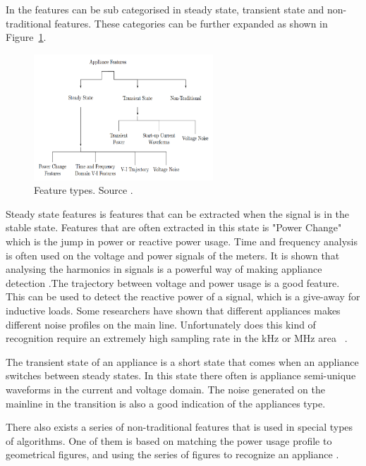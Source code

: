 In  the features can be sub categorised in steady state, transient state and non-traditional features.  These categories can be further expanded as shown in Figure~\ref{fig:FTR}. 

\begin{figure}[H]
\centering
\includegraphics[width=0.6\textwidth]{billeder/featureOverview.png}
\caption[Feature types.]{Feature types. Source \citep{RefWorks:17}.}
\label{fig:FTR}
\end{figure}

Steady state features is features that can be extracted when the signal is in the stable state. Features that are often extracted in this state is "Power Change" which is the jump in power or reactive power usage. Time and frequency analysis is often used on the voltage and power signals of the meters. It is shown that analysing the harmonics in signals is a powerful way of making appliance detection \citep{RefWorks:29}.The trajectory between voltage and power usage is a good feature. This can be used to detect the reactive power of a signal, which is a give-away for inductive loads. Some researchers have shown that different appliances makes different noise profiles on the main line. Unfortunately does this kind of recognition require an extremely high sampling rate in the kHz or MHz area~ \citep{RefWorks:30}. 

The transient state of an appliance is a short state that comes when an appliance switches between steady states. In this state there often is appliance semi-unique waveforms in the current and voltage domain. The noise generated on the mainline in the transition is also a good indication of the appliances type. 

There also exists a series of non-traditional features that is used in special types of algorithms. One of them is based on matching the power usage profile to geometrical figures, and using the series of figures to recognize an appliance \citep{RefWorks:17}.  

